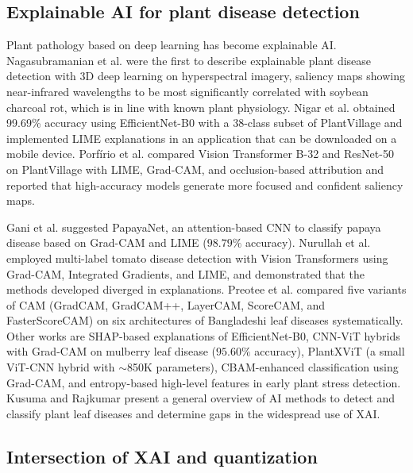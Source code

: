 \documentclass[fleqn,10pt]{wlscirep}
\begin{document}
\subsection*{Explainable AI for plant disease detection}

Plant pathology based on deep learning has become explainable AI. Nagasubramanian et al.\cite{Nagasubramanian2019plant} were the first to describe explainable plant disease detection with 3D deep learning on hyperspectral imagery, saliency maps showing near-infrared wavelengths to be most significantly correlated with soybean charcoal rot, which is in line with known plant physiology. Nigar et al.\cite{Nigar2024plant} obtained 99.69\% accuracy using EfficientNet-B0 with a 38-class subset of PlantVillage and implemented LIME explanations in an application that can be downloaded on a mobile device. Porf\'{i}rio et al.\cite{Porfirio2025plant} compared Vision Transformer B-32 and ResNet-50 on PlantVillage with LIME, Grad-CAM, and occlusion-based attribution and reported that high-accuracy models generate more focused and confident saliency maps.

Gani et al.\cite{Gani2025papaya} suggested PapayaNet, an attention-based CNN to classify papaya disease based on Grad-CAM and LIME ($98.79\%$ accuracy). Nurullah et al.\cite{Nurullah2025tomato} employed multi-label tomato disease detection with Vision Transformers using Grad-CAM, Integrated Gradients, and LIME, and demonstrated that the methods developed diverged in explanations. Preotee et al.\cite{Preotee2024bangladesh} compared five variants of CAM (GradCAM, GradCAM++, LayerCAM, ScoreCAM, and FasterScoreCAM) on six architectures of Bangladeshi leaf diseases systematically. Other works are SHAP-based explanations of EfficientNet-B0\cite{Nawar2024efficientnet}, CNN-ViT hybrids with Grad-CAM on mulberry leaf disease ($95.60\%$ accuracy)\cite{Hasan2025mulberry}, PlantXViT (a small ViT-CNN hybrid with $\sim$850K parameters)\cite{Thakur2022plantxvit}, CBAM-enhanced classification using Grad-CAM\cite{Tabassum2024cbam}, and entropy-based high-level features in early plant stress detection\cite{Lysov2022entropy}. Kusuma and Rajkumar\cite{Kusuma2025review} present a general overview of AI methods to detect and classify plant leaf diseases and determine gaps in the widespread use of XAI.

\subsection*{Intersection of XAI and quantization}
\end{document}
